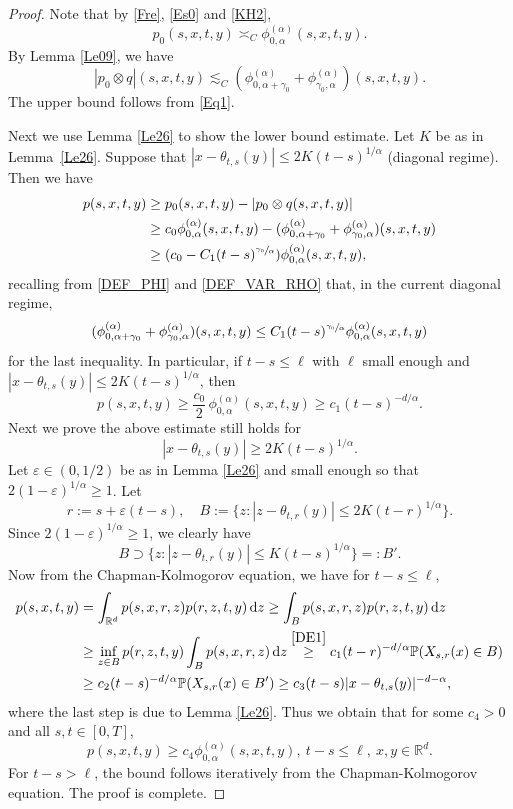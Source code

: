 \documentclass[11pt]{article}
\numberwithin{equation}{section}\providecommand{\asymp}{\mathrel{\sim}}
\theoremstyle{plain}
\theoremstyle{definition}
\let\eps\varepsilon
\newcommand\mP{\mathbb{P}}
\newcommand\mR{\mathbb{R}}
\newcommand\1{{\mathbf{1}}}
\newcommand{\dif}{\,\mathrm{d}}
\begin{document}
\begin{proof}
Note that by \eqref{Fre}, \eqref{Es0} and \eqref{KH2},
\[
p_0(s,x,t,y)\asymp_C\phi^{(\alpha)}_{0,\alpha}(s,x,t,y).
\]
By Lemma \ref{Le09}, we have
\begin{equation*}
|p_0\otimes q|(s,x,t,y)
\lesssim_C(\phi^{(\alpha)}_{0,\alpha+\gamma_0}+\phi^{(\alpha)}_{\gamma_0,\alpha})(s,x,t,y).
\end{equation*}
The upper bound follows from \eqref{Eq1}.

Next we use Lemma \ref{Le26} to show the lower bound estimate. Let $K$ be as in Lem\-ma~\ref{Le26}.
Suppose that $|x-\theta_{t,s}(y)|\leq 2K(t-s)^{1/\alpha}$ {(diagonal regime)}. Then we have
\begin{align*}
p(s,x,t,y)&\geq p_0(s,x,t,y)-|p_0\otimes q(s,x,t,y)|
\\&\geq c_0\phi^{(\alpha)}_{0,\alpha}(s,x,t,y)-(\phi^{(\alpha)}_{0,\alpha+\gamma_0}+\phi^{(\alpha)}_{\gamma_0,\alpha})(s,x,t,y)
\\&\geq (c_0-C_1(t-s)^{\sfrac{\gamma_0}{\alpha}})\phi^{(\alpha)}_{0,\alpha}(s,x,t,y),
\end{align*}
{recalling from \eqref{DEF_PHI} and \eqref{DEF_VAR_RHO} that, in the current diagonal regime,
\[
(\phi^{(\alpha)}_{0,\alpha+\gamma_0}+\phi^{(\alpha)}_{\gamma_0,\alpha})(s,x,t,y)\le C_1(t-s)^{\sfrac{\gamma_0}{\alpha}}\phi^{(\alpha)}_{0,\alpha}(s,x,t,y)
\]
for the last inequality}.
In particular, if $t-s\leq\ell$ with $\ell$ small enough and $|x-\theta_{t,s}(y)|\leq 2K(t-s)^{1/\alpha}$, then
\begin{equation}\label{DE1}
p(s,x,t,y)\geq \frac{c_0}{2}\,\phi^{(\alpha)}_{0,\alpha}(s,x,t,y)\geq c_1(t-s)^{-d/\alpha}.
\end{equation}
Next we prove the above estimate still holds for
\[
|x-\theta_{t,s}(y)|\geq 2K(t-s)^{1/\alpha}.
\]
Let $\eps\in(0,1/2)$ be as in Lemma \ref{Le26} and small enough
so that $2(1-\eps)^{1/\alpha}\geq 1$. Let
\[
r:=s+\eps(t-s),\quad B:=\{z: |z-\theta_{t,r}(y)|\leq 2K(t-r)^{1/\alpha}\}.
\]
Since $2(1-\eps)^{1/\alpha}\geq 1$, we clearly have
\[
B\supset\{z: |z-\theta_{t,r}(y)|\leq K(t-s)^{1/\alpha}\}=:B'.
\]
Now from the Chapman-Kolmogorov equation, we have for $t-s\leq\ell$,
\begin{align*}
p(s,x,t,y)&=\int_{\mR^d}p(s,x,r,z)p(r,z,t,y)\dif z
\geq\int_B p(s,x,r,z)p(r,z,t,y)\dif z
\\&\geq\inf_{z\in B}p(r,z,t,y)\int_B p(s,x,r,z)\dif z
\stackrel{\eqref{DE1}}{\geq} c_1(t-r)^{-d/\alpha}\mP(X_{s,r}(x)\in B)
\\&\geq c_2(t-s)^{-d/\alpha}\mP(X_{s,r}(x)\in B')
\geq c_3(t-s)|x-\theta_{t,s}(y)|^{-d-\alpha},
\end{align*}
where the last step is due to Lemma \ref{Le26}.
Thus we obtain that for some $c_4>0$ and all $s,t\in[0,T]$,
\[
p(s,x,t,y)\geq c_4\phi^{(\alpha)}_{0,\alpha}(s,x,t,y),\ t-s\leq\ell, \ x,y\in\mR^d.
\]
For $t-s>\ell$, the bound follows iteratively from the Chapman-Kolmogorov equation.
The proof is complete.
\end{proof}
\end{document}
